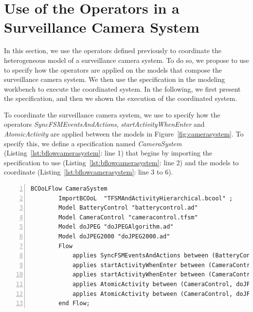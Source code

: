 \section{Use of the Operators in a Surveillance Camera System}
In this section, we use the operators defined previously to coordinate the heterogeneous model of a surveillance camera system. To do so, we propose to use \bflow to specify how the operators are applied on the models that compose the surveillance camera system. We then use the \bflow specification in the modeling workbench to execute the coordinated system. In the following, we first present the \bflow specification, and then we shown the execution of the coordinated system.    


To coordinate the surveillance camera system, we use \bflow to specify how the operators \emph{SyncFSMEventsAndActions}, \emph{startActivityWhenEnter} and \emph{AtomicActivity} are applied between the models in Figure~\ref{fig:camerasystem}. To specify this, we define a \bflow specification named \emph{CameraSystem} (Listing~\ref{lst:bflowcamerasystem}: line 1) that begins by importing the \bcool specification to use (Listing~\ref{lst:bflowcamerasystem}: line 2) and the models to coordinate (Listing~\ref{lst:bflowcamerasystem}: line 3 to 6).

		\begin{lstlisting}[language=bflow,
		caption={\bflow specification for the Surveillance Camera System},
		label={lst:bflowcamerasystem}, 
		basicstyle=\scriptsize\ttfamily, backgroundcolor=\color{LGrey}, numbers=left, xleftmargin=2pt]
		BCOoLFlow CameraSystem
		ImportBCOoL  "TFSMAndActivityHierarchical.bcool" ;
		Model BatteryControl "batterycontrol.ad"
		Model CameraControl "cameracontrol.tfsm"
		Model doJPEG "doJPEGAlgorithm.ad"
		Model doJPEG2000 "doJPEG2000.ad"
		Flow 
			applies SyncFSMEventsAndActions between (BatteryControl, CameraControl);
			applies startActivityWhenEnter between (CameraControl, doJPEG);
			applies startActivityWhenEnter between (CameraControl, doJPEG2000);
			applies AtomicActivity between (CameraControl, doJPEG);		
			applies AtomicActivity between (CameraControl, doJPEG2000);		
		end Flow;
		\end{lstlisting}
 
